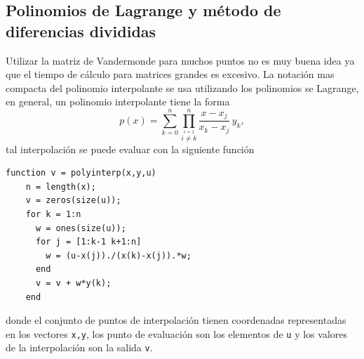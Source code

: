 \documentclass[11pt]{article}
\begin{document}
\subsection{Polinomios de Lagrange y m\'etodo de diferencias divididas}

Utilizar la matriz de Vandermonde para muchos puntos no es muy buena idea ya que el tiempo de c\'alculo para matrices grandes 
es excesivo. La notaci\'on mas compacta del polinomio interpolante se usa utilizando los polinomios se Lagrange, en general, 
un polinomio interpolante tiene la forma
$$\displaystyle
p(x)=\sum_{k=0}^{n} \prod_{\stackrel{i=1}{i\neq k}}^n \frac{x-x_j}{x_k-x_j} \, y_k,
$$
tal interpolaci\'on se puede evaluar con la siguiente funci\'on
\begin{verbatim}
function v = polyinterp(x,y,u)
    n = length(x);
    v = zeros(size(u));
    for k = 1:n
      w = ones(size(u));
      for j = [1:k-1 k+1:n]
      	w = (u-x(j))./(x(k)-x(j)).*w;
      end
      v = v + w*y(k);
    end
\end{verbatim}
donde el conjunto de puntos de interpolaci\'on tienen coordenadas representadas en los vectores \texttt{x,y}, los punto de evaluaci\'on son los elementos de \texttt{u} y los valores de la interpolaci\'on son la salida \texttt{v}.
\end{document}
